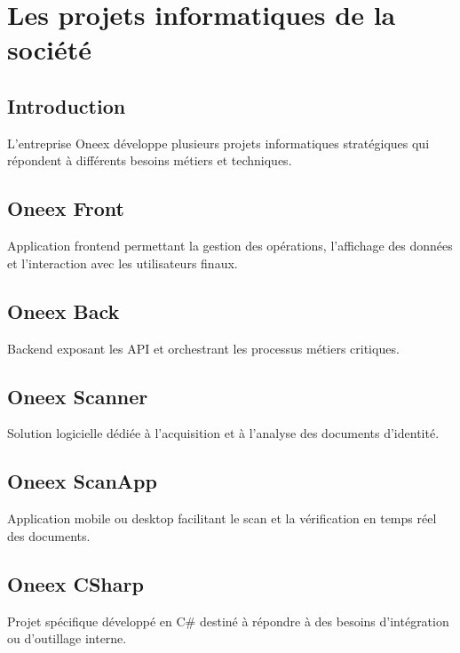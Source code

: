 \section{Les projets informatiques de la société}

\subsection{Introduction}

L’entreprise Oneex développe plusieurs projets informatiques stratégiques qui répondent à différents besoins métiers et techniques.

\subsection{Oneex Front}

Application frontend permettant la gestion des opérations, l’affichage des données et l’interaction avec les utilisateurs finaux.

\subsection{Oneex Back}

Backend exposant les API et orchestrant les processus métiers critiques.

\subsection{Oneex Scanner}

Solution logicielle dédiée à l’acquisition et à l’analyse des documents d’identité.

\subsection{Oneex ScanApp}

Application mobile ou desktop facilitant le scan et la vérification en temps réel des documents.

\subsection{Oneex CSharp}

Projet spécifique développé en C\# destiné à répondre à des besoins d’intégration ou d’outillage interne.
